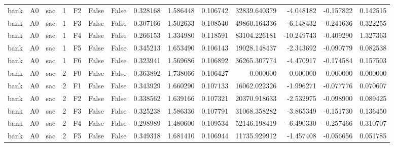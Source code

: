 \begin{tabular}{lllrlllrrrrrrr}
      bank &      A0 &       sac &     1 &  F2 &           False &            False &  0.328168 &  1.586448 & 0.106742 &     32839.640379 &          -4.048182 &       -0.157822 &            0.142515 \\
      bank &      A0 &       sac &     1 &  F3 &           False &            False &  0.307166 &  1.502633 & 0.108540 &     49860.164336 &          -6.148432 &       -0.241636 &            0.322255 \\
      bank &      A0 &       sac &     1 &  F4 &           False &            False &  0.266153 &  1.334980 & 0.118591 &     83104.226181 &         -10.249743 &       -0.409290 &            1.327363 \\
      bank &      A0 &       sac &     1 &  F5 &           False &            False &  0.345213 &  1.653490 & 0.106143 &     19028.148437 &          -2.343692 &       -0.090779 &            0.082538 \\
      bank &      A0 &       sac &     1 &  F6 &           False &            False &  0.323941 &  1.569686 & 0.106892 &     36265.307774 &          -4.470917 &       -0.174584 &            0.157503 \\
      bank &      A0 &       sac &     2 &  F0 &           False &            False &  0.363892 &  1.738066 & 0.106427 &         0.000000 &           0.000000 &        0.000000 &            0.000000 \\
      bank &      A0 &       sac &     2 &  F1 &           False &            False &  0.343929 &  1.660290 & 0.107133 &     16062.022326 &          -1.996271 &       -0.077776 &            0.070607 \\
      bank &      A0 &       sac &     2 &  F2 &           False &            False &  0.338562 &  1.639166 & 0.107321 &     20370.918633 &          -2.532975 &       -0.098900 &            0.089425 \\
      bank &      A0 &       sac &     2 &  F3 &           False &            False &  0.325238 &  1.586336 & 0.107791 &     31068.358282 &          -3.865349 &       -0.151730 &            0.136450 \\
      bank &      A0 &       sac &     2 &  F4 &           False &            False &  0.298989 &  1.480600 & 0.109534 &     52146.198419 &          -6.490330 &       -0.257466 &            0.310707 \\
      bank &      A0 &       sac &     2 &  F5 &           False &            False &  0.349318 &  1.681410 & 0.106944 &     11735.929912 &          -1.457408 &       -0.056656 &            0.051785 \\

\end{tabular}
